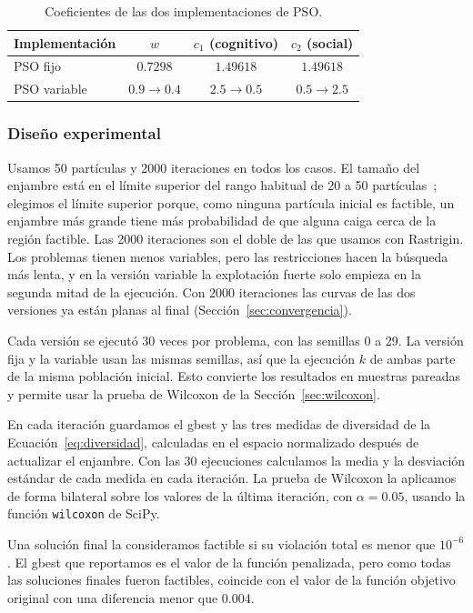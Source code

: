 \begin{table}[H]
\centering
\caption{Coeficientes de las dos implementaciones de PSO.}
\label{tab:coeficientes}
\begin{tabular}{lccc}
\toprule
Implementación & $w$ & $c_1$ (cognitivo) & $c_2$ (social) \\
\midrule
PSO fijo & $0.7298$ & $1.49618$ & $1.49618$ \\
PSO variable & $0.9 \to 0.4$ & $2.5 \to 0.5$ & $0.5 \to 2.5$ \\
\bottomrule
\end{tabular}
\end{table}

\subsubsection{Diseño experimental}

Usamos 50 partículas y 2000 iteraciones en todos los casos. El tamaño del enjambre está en el límite superior del rango habitual de 20 a 50 partículas~\cite{poli2007overview}; elegimos el límite superior porque, como ninguna partícula inicial es factible, un enjambre más grande tiene más probabilidad de que alguna caiga cerca de la región factible. Las 2000 iteraciones son el doble de las que usamos con Rastrigin. Los problemas tienen menos variables, pero las restricciones hacen la búsqueda más lenta, y en la versión variable la explotación fuerte solo empieza en la segunda mitad de la ejecución. Con 2000 iteraciones las curvas de las dos versiones ya están planas al final (Sección~\ref{sec:convergencia}).

Cada versión se ejecutó 30 veces por problema, con las semillas 0 a 29. La versión fija y la variable usan las mismas semillas, así que la ejecución $k$ de ambas parte de la misma población inicial. Esto convierte los resultados en muestras pareadas y permite usar la prueba de Wilcoxon de la Sección~\ref{sec:wilcoxon}.

En cada iteración guardamos el gbest y las tres medidas de diversidad de la Ecuación~\eqref{eq:diversidad}, calculadas en el espacio normalizado después de actualizar el enjambre. Con las 30 ejecuciones calculamos la media y la desviación estándar de cada medida en cada iteración. La prueba de Wilcoxon la aplicamos de forma bilateral sobre los valores de la última iteración, con $\alpha = 0.05$, usando la función \texttt{wilcoxon} de SciPy.

Una solución final la consideramos factible si su violación total es menor que $10^{-6}$. El gbest que reportamos es el valor de la función penalizada, pero como todas las soluciones finales fueron factibles, coincide con el valor de la función objetivo original con una diferencia menor que 0.004.

